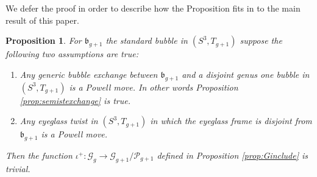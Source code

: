 \documentclass[12pt]{amsart}
\newtheorem{prop}[thm]{Proposition}
\newcommand{\calG}{\mathcal G}
\newcommand{\calP}{\mathcal P}
\newcommand{\bs}{\backslash}
\newcommand{\frb}{\mathfrak{b}}
\begin{document}
We defer the proof in order to describe how the Proposition fits in to the main result of this paper.

\begin{prop} \label{prop:main}  For $\frb_{g+1}$ the standard bubble in $(S^3, T_{g+1})$ suppose the following two assumptions are true:
\begin{enumerate}
\item Any generic bubble exchange between $\frb_{g+1}$ and a disjoint genus one bubble in $(S^3, T_{g+1})$ is a Powell move.  In other words Proposition \ref{prop:semistexchange} is true.

\item Any eyeglass twist in $(S^3, T_{g+1})$ in which the eyeglass frame is disjoint from $\frb_{g+1}$ is a Powell move.  
\end{enumerate} 
Then the function $\iota^+: \calG_g \to %
    \calG_{g+1}/\calP_{g+1}$ defined in Proposition \ref{prop:Ginclude} is trivial.
\end{prop}
\end{document}

